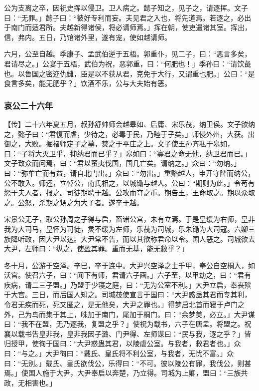 \documentclass[]{article}
\begin{document}
公为支离之卒，因祝史挥以侵卫。卫人病之。懿子知之，见子之，请逐挥。文子曰：``无罪。」懿子曰：``彼好专利而妄。夫见君之入也，将先道焉。若逐之，必出于南门而适君所。夫越新得诸侯，将必请师焉。」挥在朝，使吏遣诸其室。挥出，信，弗内。五日，乃馆诸外里，遂有宠，使如越请师。

六月，公至自越。季康子、孟武伯逆于五梧。郭重仆，见二子，曰：``恶言多矣，君请尽之。」公宴于五梧，武伯为祝，恶郭重，曰：``何肥也！」季孙曰：``请饮彘也。以鲁国之密迩仇雠，臣是以不获从君，克免于大行，又谓重也肥。」公曰：``是食言多矣，能无肥乎？」饮酒不乐，公与大夫始有恶。

\hypertarget{header-n3292}{%
\subsubsection{哀公二十六年}\label{header-n3292}}

【传】二十六年夏五月，叔孙舒帅师会越皋如、后庸、宋乐茷，纳卫侯。文子欲纳之，懿子曰：``君愎而虐，少待之，必毒于民，乃睦于子矣。」师侵外州，大获。出御之，大败。掘褚师定子之墓，焚之于平庄之上。文子使王孙齐私于皋如，曰：``子将大灭卫乎，抑纳君而已乎？」皋如曰：``寡君之命无他，纳卫君而已。」文子致众而问焉，曰：``君以蛮夷伐国，国几亡矣。请纳之。」众曰：``勿纳。」曰：``弥牟亡而有益，请自北门出。」众曰：``勿出。」重赂越人，申开守陴而纳公，公不敢入。师还，立悼公，南氏相之，以城锄与越人。公曰：``期则为此。」令苟有怨于夫人者，报之。司徒期聘于越。公攻而夺之币。期告王，王命取之。期以众取之。公怒，杀期之甥之为大子者。遂卒于越。

宋景公无子，取公孙周之子得与启，畜诸公宫，未有立焉。于是皇缓为右师，皇非我为大司马，皇怀为司徒，灵不缓为左师，乐茷为司城，乐朱锄为大司寇。六卿三族降听政，因大尹以达。大尹常不告，而以其欲称君命以令。国人恶之。司城欲去大尹，左师曰：``纵之，使盈其罪。重而无基，能无敝乎？」

冬十月，公游于空泽。辛巳，卒于连中。大尹兴空泽之士千甲，奉公自空桐入，如沃宫。使召六子，曰：``闻下有师，君请六子画。」六子至，以甲劫之，曰：``君有疾病，请二三子盟。」乃盟于少寝之庭，曰：``无为公室不利。」大尹立启，奉丧殡于大宫。三日，而后国人知之。司城茷使宣言于国曰：``大尹惑蛊其君而专其利，令君无疾而死，死又匿之，是无他矣，大尹之罪也。」得梦启北首而寝于卢门之外，己为鸟而集于其上，咮加于南门，尾加于桐门。曰：``余梦美，必立。」大尹谋曰：``我不在盟，无乃逐我，复盟之乎？」使祝为载书，六子在唐盂。将盟之。祝襄以载书告皇非我，皇非我因子潞、门尹得、左师谋曰：``民与我，逐之乎？」皆归授甲，使徇于国曰：``大尹惑蛊其君，以陵虐公室。与我者，救君者也。」众曰：``与之。」大尹徇曰：``戴氏、皇氏将不利公室，与我者，无忧不富。」众曰：``无别。」戴氏、皇氏欲伐公，乐得曰：``不可。彼以陵公有罪，我伐公，则甚焉。」使国人施于大尹，大尹奉启以奔楚，乃立得。司城为上卿，盟曰：``三族共政，无相害也。」
\end{document}
